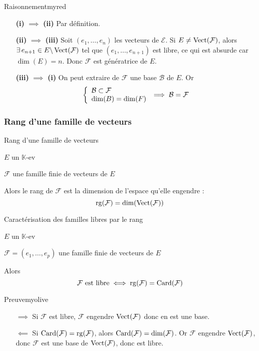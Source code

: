     \begin{demo}{Raisonnement}{myred}
        \begin{itemize}[leftmargin=3cm]
            \item[\textbf{(i)} $\implies$ \textbf{(ii)}] Par définition.
            \item[\textbf{(ii)} $\implies$ \textbf{(iii)}] Soit $(e_1,\ldots,e_n)$ les vecteurs de $\mathcal{E}$. Si $E \neq \operatorname{Vect}(\mathcal{F})$, alors $\exists \, e_{n+1} \in E \backslash \operatorname{Vect}(\mathcal{F})$ tel que $(e_1,\ldots,e_{n+1})$ est libre, ce qui est absurde car $\dim(E) = n$. Donc $\mathcal{F}$ est génératrice de $E$.
            \item[\textbf{(iii)} $\implies$ \textbf{(i)}] On peut extraire de $\mathcal{F}$ une base $\mathcal{B}$ de $E$. Or \[ \et{\mathcal{B} \subset \mathcal{F}}{\dim(B) = \dim(F)} \implies \mathcal{B} = \mathcal{F} \]
        \end{itemize}
    \end{demo}

    \subsubsection{Rang d’une famille de vecteurs}

    \begin{defi}{Rang d’une famille de vecteurs}{}
        \begin{soient}
            \item $E$ un $\mathbb{K}$-ev
            \item $\mathcal{F}$ une famille finie de vecteurs de $E$
        \end{soient}
        Alors le rang de $\mathcal{F}$ est la dimension de l’espace qu’elle engendre :
        \[ \operatorname{rg}(\mathcal{F}) = \dim(\operatorname{Vect}(\mathcal{F})) \]
    \end{defi}

    \begin{prop}{Caractérisation des familles libres par le rang}{}
        \begin{soient}
            \item $E$ un $\mathbb{K}$-ev
            \item $\mathcal{F} = (e_1,\ldots,e_p)$ une famille finie de vecteurs de $E$
        \end{soient}
        Alors \[ \mathcal{F} \text{ est libre} \iff \operatorname{rg}(\mathcal{F}) = \operatorname{Card}(\mathcal{F}) \]
    \end{prop}
    
    \begin{demo}{Preuve}{myolive}
        \begin{itemize}
            \item[$\implies$] Si $\mathcal{F}$ est libre, $\mathcal{F}$ engendre $\operatorname{Vect}(\mathcal{F})$ donc en est une base.
            \item[$\impliedby$] Si $\operatorname{Card}(\mathcal{F}) = \operatorname{rg}(\mathcal{F})$, alors $\operatorname{Card}(\mathcal{F}) = \dim(\mathcal{F})$. Or $\mathcal{F}$ engendre $\operatorname{Vect}(\mathcal{F})$, donc $\mathcal{F}$ est une base de $\operatorname{Vect}(\mathcal{F})$, donc est libre. 
        \end{itemize}
    \end{demo}


